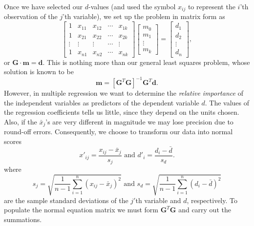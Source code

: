 Once we have selected our $d$-values (and used the symbol $x_{ij}$ to represent the $i$'th observation
of the $j$'th variable), we set up the problem in matrix form as
\begin{equation}
\left [ \begin{array}{ccccc}
1 & x_{11} & x_{12} &  \cdots & x_{1k} \\
1 & x_{21} & x_{22} &  \cdots & x_{2k} \\
\vdots & \vdots & \vdots & \cdots & \vdots \\
1 & x_{n1} & x_{n2} & \cdots & x_{nk} \end{array}\right ]
\left [ \begin{array}{c}
m_0\\ m_1\\ \vdots \\ m_k \end{array} \right ]  = 
\left [ \begin{array}{c}
d_1 \\ d_2\\ \vdots \\  d_n
\end{array} \right ],
\end{equation}	 
or $\mathbf{G\cdot m = d}$.  This is nothing more than our general least squares problem, whose solution is known to be 
\begin{equation}
\mathbf{m} = [ \mathbf{G}^T\mathbf{G} ]^{-1} \mathbf{G}^T\mathbf{d}.
\end{equation}	 	
However, in multiple regression we want to determine the \emph{relative importance} of the independent variables 
as predictors of the dependent variable $d$.  The values of the regression coefficients tells us little, 
since they depend on the units chosen.  Also, if the $\bar{x}_j$'s are very different in magnitude we may lose 
precision due to round-off errors.  Consequently, we choose to transform our data into normal scores
\begin{equation}
x'_{ij} = \frac{x_{ij} - \bar{x}_j}{s_j} \mbox{ and } d'_i = \frac{d_i - \bar{d}}{s_d}.
\end{equation}
where
\begin{equation}
s_j = \sqrt{ \frac{1}{n-1} \sum ^n _{i=1} (x_{ij} - \bar{x}_j)^2} \mbox{ and } s_d = \sqrt{ \frac{1}{n-1} \sum ^n _{i=1} (d_i - \bar{d})^2}
\end{equation}	 
are the sample standard deviations of the $j'$th variable and $d$, respectively.  To populate the normal equation matrix we must form 
$\mathbf{G}^T\mathbf{G}$ and carry out the summations.  

